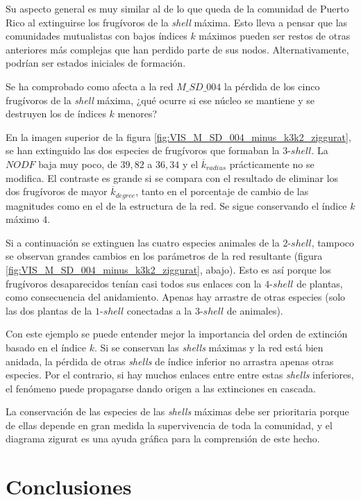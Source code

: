 Su aspecto general es muy similar al de lo que queda de la comunidad de Puerto Rico al extinguirse los frugívoros de la \textit{shell} máxima. Esto lleva a pensar que las comunidades mutualistas con bajos índices $k$ máximos pueden ser restos de otras anteriores más complejas que han perdido parte de sus nodos. Alternativamente, podrían ser estados iniciales de formación.

Se ha comprobado como afecta a la red $M\_SD\_004$ la pérdida de los cinco frugívoros de la \textit{shell} máxima, ¿qué ocurre si ese núcleo se mantiene y se destruyen los de índices $k$ menores?

En la imagen superior de la figura \ref{fig:VIS_M_SD_004_minus_k3k2_ziggurat}, se han extinguido las dos especies de frugívoros que formaban la $3$-$shell$. La $NODF$ baja muy poco, de $39,82$ a $36,34$ y el $\overline k_{radius}$ prácticamente no se modifica. El contraste es grande si se compara con el resultado de eliminar los dos frugívoros de mayor $\overline k_{degree}$, tanto en el porcentaje de cambio de las magnitudes como en el de la estructura de la red. Se sigue conservando el índice $k$ máximo $4$.

Si a continuación se extinguen las cuatro especies animales de la $2$-$shell$, tampoco se observan grandes cambios en los parámetros de la red resultante (figura \ref{fig:VIS_M_SD_004_minus_k3k2_ziggurat}, abajo). Esto es así porque los frugívoros desaparecidos tenían casi todos sus enlaces con la $4$-$shell$ de plantas, como consecuencia del anidamiento. Apenas hay arrastre de otras especies (solo las dos plantas de la $1$-$shell$ conectadas a la $3$-$shell$ de animales).

Con este ejemplo se puede entender mejor la importancia del orden de extinción basado en el índice $k$. Si se conservan las \textit{shells} máximas y la red está bien anidada, la pérdida de otras \textit{shells} de índice inferior no arrastra apenas otras especies. Por el contrario, si hay muchos enlaces entre entre estas \textit{shells} inferiores, el fenómeno puede propagarse dando origen a las extinciones en cascada.

La conservación de las especies de las \textit{shells} máximas debe ser prioritaria porque de ellas depende en gran medida la supervivencia de toda la comunidad, y el diagrama zigurat es una ayuda gráfica para la comprensión de este hecho.

\clearpage
\section{Conclusiones}


